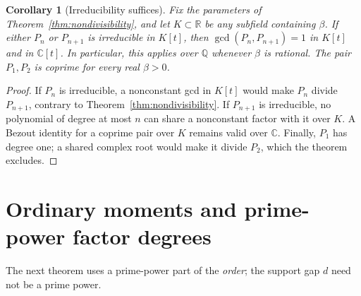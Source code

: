\documentclass[11pt]{article}
\newtheorem{corollary}[theorem]{Corollary}
\theoremstyle{remark}
\newcommand{\Q}{\mathbb Q}
\newcommand{\C}{\mathbb C}
\begin{document}
\begin{corollary}[Irreducibility suffices]\label{cor:irreducible-pair}
Fix the parameters of Theorem~\ref{thm:nondivisibility}, and let
$K\subset\mathbb R$ be any subfield containing $\beta$.
If either $P_n$ or $P_{n+1}$ is irreducible in $K[t]$, then
$\gcd(P_n,P_{n+1})=1$ in $K[t]$ and in $\C[t]$.
In particular, this applies over $\Q$ whenever $\beta$ is rational.
The pair $P_1,P_2$ is coprime for every real $\beta>0$.
\end{corollary}
\begin{proof}
If $P_n$ is irreducible, a nonconstant gcd in $K[t]$ would make $P_n$
divide $P_{n+1}$, contrary to Theorem~\ref{thm:nondivisibility}.
If $P_{n+1}$ is irreducible, no polynomial of degree at most $n$ can
share a nonconstant factor with it over $K$.
A Bezout identity for a coprime pair over $K$ remains valid over $\C$.
Finally, $P_1$ has degree one; a shared complex root would make it
divide $P_2$, which the theorem excludes.
\end{proof}

\section{Ordinary moments and prime-power factor degrees}

The next theorem uses a prime-power part of the \emph{order}; the support
gap $d$ need not be a prime power.
\end{document}
